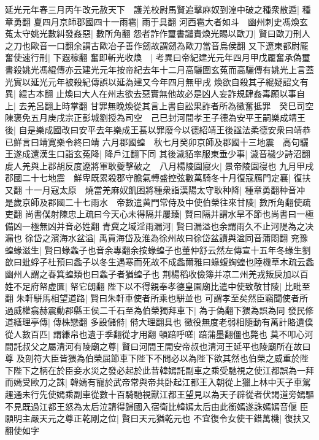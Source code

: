 延光元年春三月丙午改元赦天下　護羌校尉馬賢追擊麻奴到湟中破之種衆散遁|{
	種章勇翻}
夏四月京師郡國四十一雨雹|{
	雨于具翻}
河西雹大者如斗　幽州刺史馮煥玄菟太守姚光數糾發姦惡|{
	數所角翻}
怨者詐作璽書譴責煥光賜以歐刀|{
	賢曰歐刀刑人之刀也歐音一口翻余謂古歐冶子善作劒故謂劒為歐刀當音烏侯翻}
又下遼東都尉龎奮使速行刑|{
	下遐稼翻}
奮即斬光收煥　|{
	考異曰帝紀建光元年四月甲戊龎奮承偽璽書殺姚光馮緄傳亦云建光元年按帝紀去年十二月高驪圍玄菟而高驪傳有姚光上言蓋光實以延光元年被殺紀傳誤以延為建又今年四月無甲戌}
煥欲自殺其子緄疑詔文有異|{
	緄古本翻}
止煥曰大人在州志欲去惡實無他故必是凶人妄詐規肆姦毒願以事自上|{
	去羌呂翻上時掌翻}
甘罪無晚煥從其言上書自訟果詐者所為徵奮抵罪　癸巳司空陳褒免五月庚戌宗正彭城劉授為司空　己巳封河間孝王子德為安平王嗣樂成靖王後|{
	自是樂成國改曰安平去年樂成王萇以罪廢今以德紹靖王後諡法柔德安衆曰靖恭已鮮言曰靖寛樂令終曰靖}
六月郡國蝗　秋七月癸卯京師及郡國十三地震　高句驪王遂成還漢生口詣玄菟降|{
	降戶江翻下同}
其後濊貊率服東垂少事|{
	濊音穢少詩沼翻}
䖍人羌與上郡胡反度遼將軍耿夔擊破之　八月楊陵園寢火|{
	景帝陵園寑也}
九月甲戌郡國二十七地震　鮮卑既累殺郡守膽氣轉盛控弦數萬騎冬十月復寇鴈門定襄|{
	復扶又翻}
十一月寇太原　燒當羌麻奴飢困將種衆詣漢陽太守耿种降|{
	種章勇翻种音冲}
是歲京師及郡國二十七雨水　帝數遣黄門常侍及中使伯榮往來甘陵|{
	數所角翻使疏吏翻}
尚書僕射陳忠上疏曰今天心未得隔并屢臻|{
	賢曰隔并謂水旱不節也尚書曰一極備凶一極無凶并音必姓翻}
青冀之域淫雨漏河|{
	賢曰漏溢也余謂雨久不止河隄為之决漏也}
徐岱之濱海水盆溢|{
	禹貢海岱及淮為徐州故曰徐岱盆讀與湓同音蒲悶翻}
兖豫蝗蝝滋生|{
	賢曰蝝螽子也音余專翻余按蝝蝗子也董仲舒云然左傳宣十五年冬蝝生劉歆曰蚍蜉子杜預曰螽子以冬生遇寒而死故不成螽爾雅曰蝝蝮蜪蝗也陸機草木疏云螽幽州人謂之舂箕蝗類也曰螽子者猶蝗子也}
荆楊稻收儉簿并凉二州羌戎叛戾加以百姓不足府帑虛匱|{
	帑它朗翻}
陛下以不得親奉孝德皇園廟比遣中使致敬甘陵|{
	比毗至翻}
朱軒駢馬相望道路|{
	賢曰朱軒車使者所乘也駢並也}
可謂孝至矣然臣竊聞使者所過威權翕赫震動郡縣王侯二千石至為伯榮獨拜車下|{
	為于偽翻下猥為誤為同}
發民修道繕理亭傳|{
	傳株戀翻}
多設儲偫|{
	偫大理翻具也}
徵役無度老弱相隨動有萬計賂遺僕從人數百匹|{
	謂縑帛也遺于季翻從才用翻}
頓踣呼嗟|{
	踣蒲墨翻僵也斃也}
莫不叩心河間託叔父之屬清河有陵廟之尊|{
	賢曰河間王開安帝叔也清河王延平也陵廟所在故曰尊}
及剖符大臣皆猥為伯榮屈節車下陛下不問必以為陛下欲其然也伯榮之威重於陛下陛下之柄在於臣妾水災之發必起於此昔韓嫣託副車之乘受馳視之使江都誤為一拜而嫣受歐刀之誅|{
	韓嫣有寵於武帝常與帝共卧起江都王入朝從上獵上林中天子車駕䟆通未行先使嫣乘副車從數十百騎馳視獸江都王望見以為天子辟從者伏謁道旁嫣驅不見既過江都王怒為太后泣請得歸國入宿衛比韓嫣太后由此銜嫣遂誅嫣嫣音偃}
臣願明主嚴天元之尊正乾剛之位|{
	賢曰天元猶乾元也}
不宜復令女使干錯萬機|{
	復扶又翻使如字}
